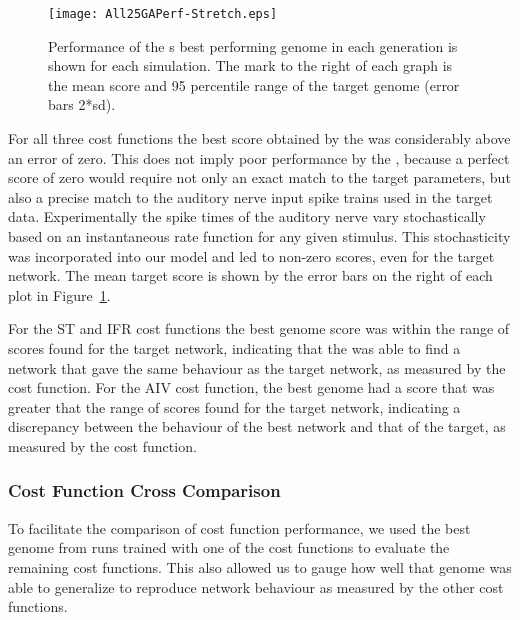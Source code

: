 \begin{figure}[t!]
  \centering
  \texttt{[image: All25GAPerf-Stretch.eps]}
  \caption{Performance of the {\GA}s best performing genome in each
    generation is shown for each simulation. The mark to the right of
    each graph is the mean score and 95 percentile range of the target
    genome (error bars 2*sd).}\label{fig:GA:R1}
\end{figure}

\smallskip{}

For all three cost functions the best score obtained by the {\GA} was considerably
above an error of zero. This does not imply poor performance by the {\GA}, because
a perfect score of zero would require not only an exact match to the target
parameters, but also a precise match to the auditory nerve input spike trains
used in the target data. Experimentally the spike times of the auditory nerve
vary stochastically based on an instantaneous rate function for any given
stimulus. This stochasticity was incorporated into our model and led to non-zero
scores, even for the target network. The mean target score is shown by the error
bars on the right of each plot in Figure~\ref{fig:GA:R1}.

\smallskip{}

For the ST and IFR cost functions the best genome score was within the range of
scores found for the target network, indicating that the {\GA} was able to find a
network that gave the same behaviour as the target network, as measured by the
cost function. For the AIV cost function, the best genome had a score that was
greater that the range of scores found for the target network, indicating a
discrepancy between the behaviour of the best network and that of the target, as
measured by the cost function.




\subsubsection{Cost Function Cross Comparison}

To facilitate the comparison of cost function performance, we used the best
genome from {\GA} runs trained with one of the cost functions to evaluate the
remaining cost functions. This also allowed us to gauge how well that genome was
able to generalize to reproduce network behaviour as measured by the other cost
functions.


